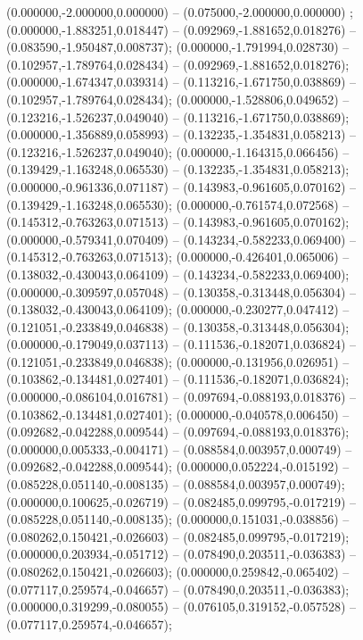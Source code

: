  (0.000000,-2.000000,0.000000) -- (0.075000,-2.000000,0.000000) ;
 (0.000000,-1.883251,0.018447) -- (0.092969,-1.881652,0.018276) -- (0.083590,-1.950487,0.008737);
 (0.000000,-1.791994,0.028730) -- (0.102957,-1.789764,0.028434) -- (0.092969,-1.881652,0.018276);
 (0.000000,-1.674347,0.039314) -- (0.113216,-1.671750,0.038869) -- (0.102957,-1.789764,0.028434);
 (0.000000,-1.528806,0.049652) -- (0.123216,-1.526237,0.049040) -- (0.113216,-1.671750,0.038869);
 (0.000000,-1.356889,0.058993) -- (0.132235,-1.354831,0.058213) -- (0.123216,-1.526237,0.049040);
 (0.000000,-1.164315,0.066456) -- (0.139429,-1.163248,0.065530) -- (0.132235,-1.354831,0.058213);
 (0.000000,-0.961336,0.071187) -- (0.143983,-0.961605,0.070162) -- (0.139429,-1.163248,0.065530);
 (0.000000,-0.761574,0.072568) -- (0.145312,-0.763263,0.071513) -- (0.143983,-0.961605,0.070162);
 (0.000000,-0.579341,0.070409) -- (0.143234,-0.582233,0.069400) -- (0.145312,-0.763263,0.071513);
 (0.000000,-0.426401,0.065006) -- (0.138032,-0.430043,0.064109) -- (0.143234,-0.582233,0.069400);
 (0.000000,-0.309597,0.057048) -- (0.130358,-0.313448,0.056304) -- (0.138032,-0.430043,0.064109);
 (0.000000,-0.230277,0.047412) -- (0.121051,-0.233849,0.046838) -- (0.130358,-0.313448,0.056304);
 (0.000000,-0.179049,0.037113) -- (0.111536,-0.182071,0.036824) -- (0.121051,-0.233849,0.046838);
 (0.000000,-0.131956,0.026951) -- (0.103862,-0.134481,0.027401) -- (0.111536,-0.182071,0.036824);
 (0.000000,-0.086104,0.016781) -- (0.097694,-0.088193,0.018376) -- (0.103862,-0.134481,0.027401);
 (0.000000,-0.040578,0.006450) -- (0.092682,-0.042288,0.009544) -- (0.097694,-0.088193,0.018376);
 (0.000000,0.005333,-0.004171) -- (0.088584,0.003957,0.000749) -- (0.092682,-0.042288,0.009544);
 (0.000000,0.052224,-0.015192) -- (0.085228,0.051140,-0.008135) -- (0.088584,0.003957,0.000749);
 (0.000000,0.100625,-0.026719) -- (0.082485,0.099795,-0.017219) -- (0.085228,0.051140,-0.008135);
 (0.000000,0.151031,-0.038856) -- (0.080262,0.150421,-0.026603) -- (0.082485,0.099795,-0.017219);
 (0.000000,0.203934,-0.051712) -- (0.078490,0.203511,-0.036383) -- (0.080262,0.150421,-0.026603);
 (0.000000,0.259842,-0.065402) -- (0.077117,0.259574,-0.046657) -- (0.078490,0.203511,-0.036383);
 (0.000000,0.319299,-0.080055) -- (0.076105,0.319152,-0.057528) -- (0.077117,0.259574,-0.046657);
